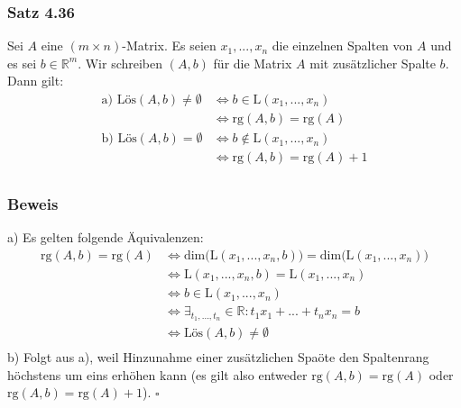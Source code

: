 \documentclass{article}
\begin{document}
\subsubsection*{Satz 4.36}
Sei $A$ eine $(m \times n)$-Matrix. Es seien $x_1,...,x_n$ die einzelnen Spalten von $A$ und es sei $b \in \mathbb{R}^m$. 
Wir schreiben $(A,b)$ für die Matrix $A$ mit zusätzlicher Spalte $b$. \\    
Dann gilt: \\
\begin{align*}
    \text{a) Lös}(A,b) \neq \emptyset &\Leftrightarrow b \in \text{L}(x_1,...,x_n) \\
    &\Leftrightarrow \text{rg}(A,b) = \text{rg}(A) \\
    \text{b) Lös}(A,b) = \emptyset &\Leftrightarrow b \notin \text{L}(x_1,...,x_n) \\
    &\Leftrightarrow \text{rg}(A,b) = \text{rg}(A) + 1 \\
\end{align*}
\subsubsection*{Beweis}
a) Es gelten folgende Äquivalenzen: \\
\begin{align*}
    \text{rg}(A,b) = \text{rg}(A) &\Leftrightarrow \text{dim(L}(x_1,...,x_n,b)) = \text{dim(L}(x_1,...,x_n)) \\
    &\Leftrightarrow \text{L}(x_1,...,x_n,b) = \text{L}(x_1,...,x_n) \\
    &\Leftrightarrow b \in \text{L}(x_1,...,x_n) \\
    &\Leftrightarrow \exists_{t_1, ..., t_n} \in \mathbb{R}: t_1 x_1 + ... + t_n x_n = b \\
    &\Leftrightarrow \text{Lös}(A,b) \neq \emptyset \\
\end{align*}
b) Folgt aus a), weil Hinzunahme einer zusätzlichen Spaöte den Spaltenrang höchstens um eins erhöhen kann (es gilt also entweder $\text{rg}(A,b) = \text{rg}(A)$ oder $\text{rg}(A,b) = \text{rg}(A) + 1$). $\square$ \\
\\
\end{document}
